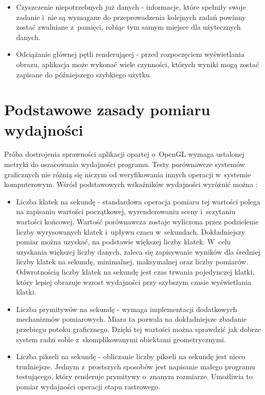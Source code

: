 \documentclass[a4paper,twoside,12pt]{book}
\begin{document}
\begin{itemize}
    \item Czyszczenie niepotrzebnych już danych \cite{ogl_guide} \cite{bib:superbible} - informacje, które spełniły swoje zadanie i~nie są wymagane do przeprowadzenia kolejnych zadań powinny zostać zwalniane z~pamięci, robiąc tym samym miejsce dla użytecznych danych.
    \item Odciążanie głównej pętli renderującej \cite{ogl_guide} \cite{lod4} - przed rozpoczęciem wyświetlania obrazu, aplikacja może wykonać wiele czynności, których wyniki mogą zostać zapisane do późniejszego szybkiego użytku.
\end{itemize}


\section{Podstawowe zasady pomiaru wydajności}
Próba dostrojenia sprawności aplikacji opartej o~OpenGL wymaga ustalonej metryki do oszacowania wydajności programu. Testy porównawcze systemów graficznych nie różnią się niczym od weryfikowania innych operacji w~systemie komputerowym. Wśród podstawowych wskaźników wydajności wyróżnić można \cite{trapp}:
\begin{itemize}
    \item Liczba klatek na sekundę - standardowa operacja pomiaru tej wartości polega na zapisaniu wartości początkowej, wyrenderowaniu sceny i~sczytaniu wartości końcowej. Wartość porównawcza zostaje wyliczona przez podzielenie liczby wyrysowanych klatek i~upływu czasu w~sekundach. Dokładniejszy pomiar można uzyskać, na podstawie większej liczby klatek. W~celu uzyskania większej liczby danych, zaleca się zapisywanie wyników dla średniej liczby klatek na sekundę, minimalnej, maksymalnej oraz liczby pomiarów. Odwrotnością liczby klatek na sekundę jest czas trwania pojedynczej klatki, który lepiej obrazuje wzrost wydajności przy szybszym czasie wyświetlania klatki.
    \item Liczba prymitywów na sekundę - wymaga implementacji dodatkowych mechanizmów pomiarowych. Miara ta pozwala na dokładniejsze zbadanie przebiegu potoku graficznego. Dzięki tej wartości można sprawdzić jak dobrze system radzi sobie z~skomplikowanymi obiektami geometrycznymi.
    \item Liczba pikseli na sekundę - obliczanie liczby pikseli na sekundę jest nieco trudniejsze. Jednym z~prostszych sposobów jest napisanie małego programu testującego, który renderuje prymitywy o~znanym rozmiarze. Umożliwia to pomiar wydajności operacji etapu rastrowego.
\end{itemize}
\end{document}
